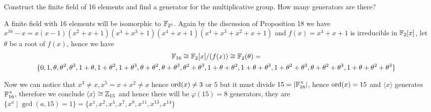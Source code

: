 \begin{exercise}
    Construct the finite field of 16 elements and find a generator for the multiplicative group. How many generators are there?
\end{exercise}
\begin{solution}
    A finite field with 16 elements will be isomorphic to $\mathbb{F}_{2^4}$. Again by the discussion of Proposition 18 we have $x^{16} - x = x(x-1)(x^2 + x + 1)(x^4 + x^3 + 1)(x^4 + x + 1)(x^4 + x^3 + x^2 + x + 1)$ and $f(x) = x^4 + x + 1$ is irreducible in $\mathbb{F}_2[x]$, let $\theta$ be a root of $f(x)$, hence we have 
    \begin{multline*}
    \mathbb{F}_{16} \cong \mathbb{F}_2[x]/(f(x)) \cong \mathbb{F}_2(\theta) = \\
    \{0, 1, \theta, \theta^2, \theta^3, 1 + \theta, 1 + \theta^2, 1 + \theta^3, \theta + \theta^2, \theta + \theta^3, \theta^2 + \theta^3, 1 + \theta + \theta^2, 1 + \theta + \theta^3, 1 + \theta^2 + \theta^3,\theta + \theta^2 + \theta^3, 1 + \theta + \theta^2 + \theta^3\}
    \end{multline*}

    \noindent Now we can notice that $x^3 \neq x, x^5 = x + x^2 \neq x$ hence $\operatorname{ord}(x) \neq 3$ or $5$ but it must divide $15 = |\mathbb{F}_{16}^{\times}|$, hence $\operatorname{ord}(x) = 15$ and $\langle x \rangle$ generates $\mathbb{F}_{16}^{\times}$, therefore we conclude $\langle x \rangle \cong \mathbb{Z}_{15}$ and hence there will be $\varphi(15) = 8$ generators, they are $\{x^a \mid \gcd(a, 15) = 1\} = \{x^1,x^2,x^4,x^7,x^8,x^{11},x^{13},x^{14}\}$
\end{solution}

